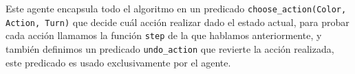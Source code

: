 \documentclass[a4paper,11pt]{article}
\begin{document}
Este agente encapsula todo el algoritmo en un predicado \verb+choose_action(Color, Action, Turn)+ que decide cu\'al acci\'on realizar dado el estado actual, para probar cada acci\'on llamamos la funci\'on \verb+step+ de la que hablamos anteriormente, y tambi\'en definimos un predicado \verb+undo_action+ que revierte la acci\'on realizada, este predicado es usado exclusivamente por el agente.
\end{document}
